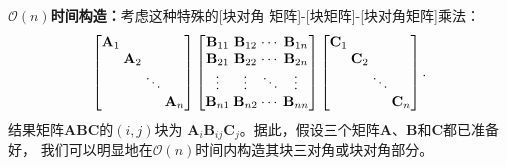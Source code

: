 \textbf{$\mathcal{O}(n)$时间构造：}考虑这种特殊的[块对角
    矩阵]-[块矩阵]-[块对角矩阵]乘法：
\begin{equation}
  \label{eq:bmb_multiplication}
  \setlength{\arraycolsep}{1.2pt}
  \begin{bmatrix}
    \mathbf{A}_{1} &                &        &                \\
                   & \mathbf{A}_{2} &        &                \\
                   &                & \ddots &                \\
                   &                &        & \mathbf{A}_{n}
  \end{bmatrix}
  \begin{bmatrix}
    \mathbf{B}_{11} & \mathbf{B}_{12} & \cdots & \mathbf{B}_{1n} \\
    \mathbf{B}_{21} & \mathbf{B}_{22} & \cdots & \mathbf{B}_{2n} \\
    \vdots          & \vdots          & \ddots & \vdots          \\
    \mathbf{B}_{n1} & \mathbf{B}_{n2} & \cdots & \mathbf{B}_{nn} \\
  \end{bmatrix}
  \begin{bmatrix}
    \mathbf{C}_{1} &                &        &                \\
                   & \mathbf{C}_{2} &        &                \\
                   &                & \ddots &                \\
                   &                &        & \mathbf{C}_{n}
  \end{bmatrix}.
\end{equation}
结果矩阵$\mathbf A \mathbf B \mathbf C$的$(i, j)$块为
$\mathbf{A}_{i} \mathbf{B}_{ij} \mathbf{C}_{j}$。据此，假设三个矩阵$\mathbf A$、$\mathbf B$和$\mathbf C$都已准备好，
我们可以明显地在$\mathcal{O}(n)$时间内构造其块三对角或块对角部分。

